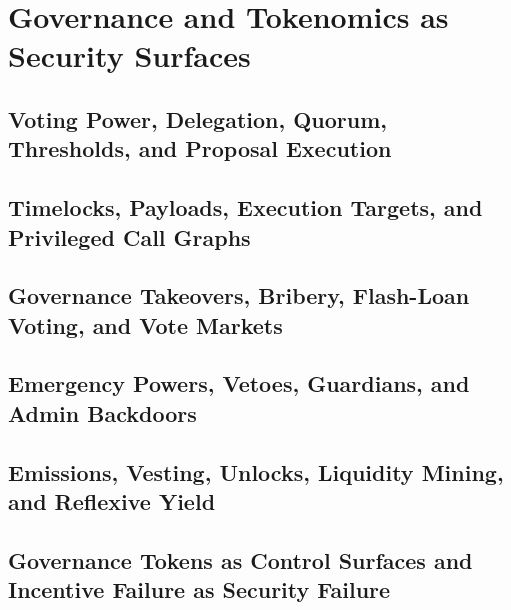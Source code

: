 \chapter{Governance and Tokenomics as Security Surfaces}

\section{Voting Power, Delegation, Quorum, Thresholds, and Proposal Execution}

\section{Timelocks, Payloads, Execution Targets, and Privileged Call Graphs}

\section{Governance Takeovers, Bribery, Flash-Loan Voting, and Vote Markets}

\section{Emergency Powers, Vetoes, Guardians, and Admin Backdoors}

\section{Emissions, Vesting, Unlocks, Liquidity Mining, and Reflexive Yield}

\section{Governance Tokens as Control Surfaces and Incentive Failure as Security Failure}
